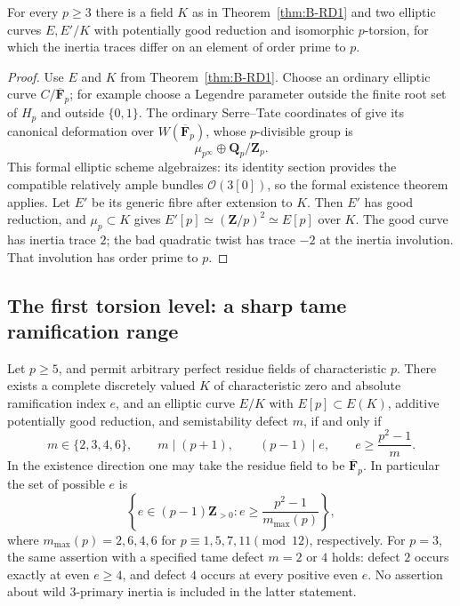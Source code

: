\begin{corollary}\label{cor:B-RD6}
For every $p\geq3$ there is a field $K$ as in Theorem~\ref{thm:B-RD1}
and two elliptic curves $E,E'/K$ with potentially good reduction and
isomorphic $p$-torsion, for which the inertia traces differ on an element
of order prime to $p$.
\end{corollary}
\begin{proof}
Use $E$ and $K$ from Theorem~\ref{thm:B-RD1}. Choose an ordinary
elliptic curve $C/\overline{\mathbf F}_p$; for example choose a Legendre
parameter outside the finite root set of $H_p$ and outside $\{0,1\}$.
The ordinary Serre--Tate coordinates of
\cite[Theorem~2.1]{Katz1981SerreTate} give its canonical deformation
over $W(\overline{\mathbf F}_p)$, whose $p$-divisible group is
\[
 \mu_{p^\infty}\oplus\mathbf Q_p/\mathbf Z_p.
\]
This formal elliptic scheme algebraizes: its identity section provides
the compatible relatively ample bundles $\mathcal O(3[0])$, so the
formal existence theorem applies. Let $E'$ be its generic fibre after
extension to $K$. Then $E'$ has good reduction, and $\mu_p\subset K$
gives $E'[p]\simeq(\mathbf Z/p)^2\simeq E[p]$ over $K$.
The good curve has inertia trace $2$; the bad quadratic twist has trace
$-2$ at the inertia involution. That involution has order prime to $p$.
\end{proof}

\subsection{The first torsion level: a sharp tame ramification range}

\begin{theorem}\label{thm:B-RD7}
Let $p\geq5$, and permit arbitrary perfect residue fields of characteristic
$p$. There exists a complete discretely valued $K$ of characteristic zero
and absolute ramification index $e$, and an elliptic curve $E/K$ with
$E[p]\subset E(K)$, additive potentially good reduction, and semistability
defect $m$, if and only if
\[
 m\in\{2,3,4,6\},\qquad m\mid(p+1),\qquad
 (p-1)\mid e,\qquad e\geq\frac{p^2-1}{m}.
\]
In the existence direction one may take the residue field to be
$\overline{\mathbf F}_p$. In particular the set of possible $e$ is
\[
 \left\{e\in(p-1)\mathbf Z_{>0}:
 e\geq\frac{p^2-1}{m_{\max}(p)}\right\},
\]
where $m_{\max}(p)=2,6,4,6$ for $p\equiv1,5,7,11\pmod {12}$,
respectively. For $p=3$, the same assertion with a specified tame defect
$m=2$ or $4$ holds: defect $2$ occurs exactly at even $e\geq4$, and
defect $4$ occurs at every positive even $e$. No assertion about wild
3-primary inertia is included in the latter statement.
\end{theorem}

